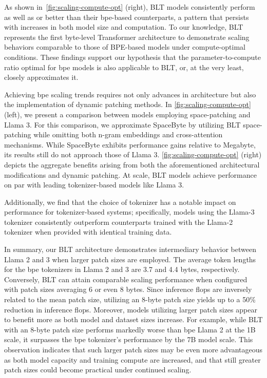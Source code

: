 As shown in~\autoref{fig:scaling-compute-opt} (right), {\textsc BLT} models consistently perform as well as or better than their bpe-based counterparts, a pattern that persists with increases in both model size and computation. To our knowledge, {\textsc BLT} represents the first byte-level Transformer architecture to demonstrate scaling behaviors comparable to those of BPE-based models under compute-optimal conditions. These findings support our hypothesis that the parameter-to-compute ratio optimal for bpe models is also applicable to {\textsc BLT}, or, at the very least, closely approximates it.

Achieving bpe scaling trends requires not only advances in architecture but also the implementation of dynamic patching methods. In \autoref{fig:scaling-compute-opt} (left), we present a comparison between models employing space-patching and Llama 3. For this comparison, we approximate SpaceByte \citep{slagle2024spacebyte} by utilizing {\textsc BLT} space-patching while omitting both n-gram embeddings and cross-attention mechanisms. While SpaceByte exhibits performance gains relative to Megabyte, its results still do not approach those of Llama 3. \autoref{fig:scaling-compute-opt} (right) depicts the aggregate benefits arising from both the aforementioned architectural modifications and dynamic patching. At scale, {\textsc BLT} models achieve performance on par with leading tokenizer-based models like Llama 3.

Additionally, we find that the choice of tokenizer has a notable impact on performance for tokenizer-based systems; specifically, models using the Llama-3 tokenizer consistently outperform counterparts trained with the Llama-2 tokenizer when provided with identical training data.

In summary, our {\textsc BLT} architecture demonstrates intermediary behavior between Llama 2 and 3 when larger patch sizes are employed. The average token lengths for the bpe tokenizers in Llama 2 and 3 are 3.7 and 4.4 bytes, respectively. Conversely, {\textsc BLT} can attain comparable scaling performance when configured with patch sizes averaging 6 or even 8 bytes. Since inference flops are inversely related to the mean patch size, utilizing an 8-byte patch size yields up to a 50\% reduction in inference flops. Moreover, models utilizing larger patch sizes appear to benefit more as both model and dataset sizes increase. For example, while {\textsc BLT} with an 8-byte patch size performs markedly worse than bpe Llama 2 at the 1B scale, it surpasses the bpe tokenizer’s performance by the 7B model scale. This observation indicates that such larger patch sizes may be even more advantageous as both model capacity and training compute are increased, and that still greater patch sizes could become practical under continued scaling.

